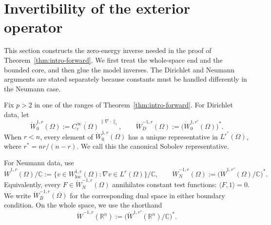 \documentclass[12pt]{amsart}
\theoremstyle{remark}
\begin{document}





\section{Invertibility of the exterior operator}
\label{sec:homogeneous-invertibility}

This section constructs the zero-energy inverse needed in the proof of
Theorem~\ref{thm:intro-forward}.  We first treat the whole-space end and
the bounded core, and then glue the model inverses.  The Dirichlet and
Neumann arguments are stated separately because constants must be handled
differently in the Neumann case.


Fix \(p>2\) in one of the ranges of Theorem~\ref{thm:intro-forward}.
For Dirichlet data, let
\[
 \dot W^{1,r}_0(\Omega)
 :=\overline{C_c^\infty(\Omega)}^{\,\|\nabla\cdot\|_r},
 \qquad
 \dot W^{-1,r}_D(\Omega)
 :=\bigl(\dot W^{1,r'}_0(\Omega)\bigr)^*.
\]
When \(r<n\), every element of \(\dot W^{1,r}_0(\Omega)\) has a unique
representative in \(L^{r^*}(\Omega)\), where \(r^*=nr/(n-r)\).  We call
this the canonical Sobolev representative.  


For Neumann data, use
\[
 \dot W^{1,r}(\Omega)/\mathbb C
 :=\{v\in W^{1,r}_{\mathrm{loc}}(\Omega):
          \nabla v\in L^r(\Omega)\}/\mathbb C,
 \qquad
 \dot W^{-1,r}_N(\Omega)
 :=\bigl(\dot W^{1,r'}(\Omega)/\mathbb C\bigr)^*.
\]
Equivalently, every \(F\in\dot W^{-1,r}_N(\Omega)\) annihilates constant
test functions: \(\langle F,1\rangle=0\).  We write
\(\dot W^{-1,r}_B(\Omega)\) for the corresponding dual space in either
boundary condition.
On the whole space, we use the shorthand
\[
 \dot W^{-1,r}(\mathbb R^n)
 :=\bigl(\dot W^{1,r'}(\mathbb R^n)/\mathbb C\bigr)^*.
\]
\end{document}
